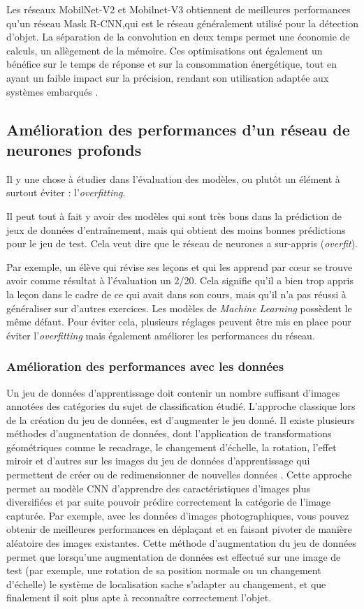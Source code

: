Les réseaux MobilNet-V2 et Mobilnet-V3 obtiennent de meilleures performances qu’un réseau Mask R-CNN,qui est le réseau généralement utilisé pour la détection d'objet.
La séparation de la convolution en deux temps permet une économie de calculs, un allègement de la mémoire. Ces optimisations ont également un bénéfice sur le temps de réponse et sur la consommation énergétique, tout en ayant un faible impact sur la précision, rendant son utilisation adaptée aux systèmes embarqués \cite{howard_mobilenets_2017}.

\subsection{Amélioration des performances d'un réseau de neurones profonds}

Il y une chose à étudier dans l’évaluation des modèles, ou plutôt un élément à surtout éviter : l'\textit{overfitting}.

Il peut tout à fait y avoir des modèles qui sont très bons dans la prédiction de jeux de données d’entraînement, mais qui obtient des moins bonnes prédictions pour le jeu de test. Cela veut dire que le réseau de neurones a sur-appris (\textit{overfit}). 

Par exemple, un élève qui révise ses leçons et qui les apprend par cœur se trouve avoir comme résultat à l’évaluation un 2/20.
Cela signifie qu’il a bien trop appris la leçon dans le cadre de ce qui avait dans son cours, mais qu’il n’a pas réussi à généraliser sur d’autres exercices. Les modèles de \textit{Machine Learning} possèdent le même défaut.
Pour éviter cela, plusieurs réglages peuvent être mis en place pour éviter l'\textit{overfitting} mais également améliorer les performances du réseau. 

\subsubsection{Amélioration des performances avec les données}

Un jeu de données d’apprentissage doit contenir un nombre suffisant d’images annotées des catégories du sujet de classification étudié. L'approche classique lors de la création du jeu de données, est d'augmenter le jeu donné. Il existe plusieurs méthodes d’augmentation de données, dont l’application de transformations géométriques comme le recadrage, le changement d’échelle, la rotation, l’effet miroir et d’autres sur les images du jeu de données d’apprentissage qui permettent de créer ou de redimensionner de nouvelles données \cite{daou_amelioration_nodate}. Cette approche permet au modèle CNN d’apprendre des caractéristiques d’images plus diversifiées et par suite pouvoir prédire correctement la catégorie de l’image capturée. Par exemple, avec les données d'images photographiques, vous pouvez obtenir de meilleures performances en déplaçant et en faisant pivoter de manière aléatoire des images existantes. Cette méthode d'augmentation du jeu de données permet que lorsqu'une augmentation de données est effectué sur une image de test (par exemple, une rotation de sa position normale ou un changement d'échelle) le système de localisation sache s'adapter au changement, et que finalement il soit plus apte à reconnaître correctement l'objet.

